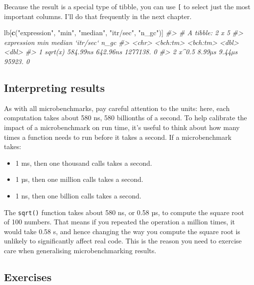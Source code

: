 \documentclass[]{book}
\newenvironment{Shaded}{\begin{snugshade}}{\end{snugshade}}
\newcommand{\CommentTok}[1]{\textcolor[rgb]{0.37,0.37,0.37}{\textit{#1}}}
\newcommand{\KeywordTok}[1]{\textcolor[rgb]{0.27,0.27,0.27}{\textbf{#1}}}
\newcommand{\NormalTok}[1]{#1}
\newcommand{\StringTok}[1]{\textcolor[rgb]{0.5,0.5,0.5}{#1}}
\providecommand{\tightlist}{%
  \setlength{\itemsep}{0pt}\setlength{\parskip}{0pt}}
\begin{document}
Because the result is a special type of tibble, you can use \texttt{{[}} to select just the most important columns. I'll do that frequently in the next chapter.

\begin{Shaded}
\begin{Highlighting}[]
\NormalTok{lb[}\KeywordTok{c}\NormalTok{(}\StringTok{"expression"}\NormalTok{, }\StringTok{"min"}\NormalTok{, }\StringTok{"median"}\NormalTok{, }\StringTok{"itr/sec"}\NormalTok{, }\StringTok{"n_gc"}\NormalTok{)]}
\CommentTok{#> # A tibble: 2 x 5}
\CommentTok{#>   expression      min   median `itr/sec`  n_gc}
\CommentTok{#>   <chr>      <bch:tm> <bch:tm>     <dbl> <dbl>}
\CommentTok{#> 1 sqrt(x)    584.99ns 642.96ns  1277138.     0}
\CommentTok{#> 2 x^0.5        8.99µs   9.44µs    95923.     0}
\end{Highlighting}
\end{Shaded}

\hypertarget{interpreting-results}{%
\subsection{Interpreting results}\label{interpreting-results}}

As with all microbenchmarks, pay careful attention to the units: here, each computation takes about 580 ns, 580 billionths of a second. To help calibrate the impact of a microbenchmark on run time, it's useful to think about how many times a function needs to run before it takes a second. If a microbenchmark takes:

\begin{itemize}
\tightlist
\item
  1 ms, then one thousand calls takes a second.
\item
  1 µs, then one million calls takes a second.
\item
  1 ns, then one billion calls takes a second.
\end{itemize}

The \texttt{sqrt()} function takes about 580 ns, or 0.58 µs, to compute the square root of 100 numbers. That means if you repeated the operation a million times, it would take 0.58 s, and hence changing the way you compute the square root is unlikely to significantly affect real code. This is the reason you need to exercise care when generalising microbenchmarking results.

\hypertarget{exercises-17}{%
\subsection{Exercises}\label{exercises-17}}
\end{document}

